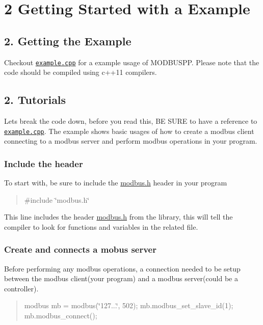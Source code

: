 \section*{2 Getting Started with a Example}

\subsection*{2. Getting the Example}

Checkout \href{https://github.com/fanzhe98/modbuspp/blob/master/example.cpp}{\tt example.\+cpp} for a example usage of M\+O\+D\+B\+U\+S\+PP. Please note that the code should be compiled using c++11 compilers. \subsection*{2. Tutorials}

Let\textquotesingle{}s break the code down, before you read this, BE S\+U\+RE to have a reference to \href{https://github.com/fanzhe98/modbuspp/blob/master/example.cpp}{\tt example.\+cpp}. The example shows basic usages of how to create a modbus client connecting to a modbus server and perform modbus operations in your program. \subsubsection*{Include the header}

To start with, be sure to include the \mbox{\hyperlink{modbus_8h_source}{modbus.\+h}} header in your program \begin{quote}
\#include \char`\"{}modbus.\+h\char`\"{} \end{quote}


This line includes the header \mbox{\hyperlink{modbus_8h_source}{modbus.\+h}} from the library, this will tell the compiler to look for functions and variables in the related file.

\subsubsection*{Create and connects a mobus server}

Before performing any modbus operations, a connection needed to be setup between the modbus client(your program) and a modbus server(could be a controller).

\begin{quote}
modbus mb = modbus(\char`\"{}127...\char`\"{}, 502); mb.\+modbus\+\_\+set\+\_\+slave\+\_\+id(1); mb.\+modbus\+\_\+connect(); \end{quote}


